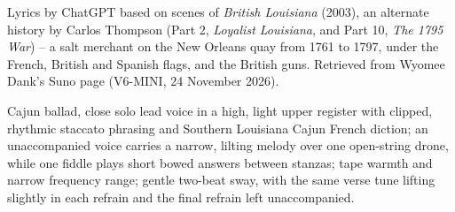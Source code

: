 
\begin{notes}
Lyrics by ChatGPT based on scenes of \emph{British Louisiana} (2003), an alternate history by Carlos Thompson (Part 2, \emph{Loyalist Louisiana}, and Part 10, \emph{The 1795 War}) -- a salt merchant on the New Orleans quay from 1761 to 1797, under the French, British and Spanish flags, and the British guns. Retrieved from Wyomee Dank's Suno page (V6-MINI, 24 November 2026).
\end{notes}
\begin{style}
Cajun ballad, close solo lead voice in a high, light upper register with clipped, rhythmic staccato phrasing and Southern Louisiana Cajun French diction; an unaccompanied voice carries a narrow, lilting melody over one open-string drone, while one fiddle plays short bowed answers between stanzas; tape warmth and narrow frequency range; gentle two-beat sway, with the same verse tune lifting slightly in each refrain and the final refrain left unaccompanied.
\end{style}
